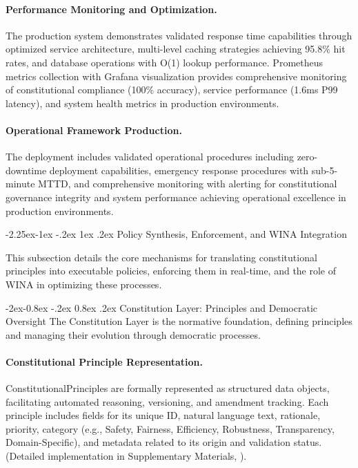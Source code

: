 \documentclass[manuscript,screen,9pt]{acmart}
\makeatletter
\renewcommand\subsection{\@startsection{subsection}{2}{\z@}%
  {-2.25ex\@plus -1ex \@minus -.2ex}%
  {1ex \@plus .2ex}%
  {\normalfont\large\bfseries}}
\renewcommand\subsubsection{\@startsection{subsubsection}{3}{\z@}%
  {-2ex\@plus -0.8ex \@minus -.2ex}%
  {0.8ex \@plus .2ex}%
  {\normalfont\normalsize\bfseries}}
\makeatother
\begin{document}
\paragraph{Performance Monitoring and Optimization.} The production system demonstrates validated response time capabilities through optimized service architecture, multi-level caching strategies achieving 95.8\% hit rates, and database operations with O(1) lookup performance. Prometheus metrics collection with Grafana visualization provides comprehensive monitoring of constitutional compliance (100\% accuracy), service performance (1.6ms P99 latency), and system health metrics in production environments.

\paragraph{Operational Framework Production.} The deployment includes validated operational procedures including zero-downtime deployment capabilities, emergency response procedures with sub-5-minute MTTD, and comprehensive monitoring with alerting for constitutional governance integrity and system performance achieving operational excellence in production environments.

\subsection{Policy Synthesis, Enforcement, and WINA Integration}
\label{subsec:policy_synthesis_enforcement}

This subsection details the core mechanisms for translating constitutional principles into executable policies, enforcing them in real-time, and the role of WINA in optimizing these processes.

\subsubsection{Constitution Layer: Principles and Democratic Oversight}
\label{subsubsec:constitution_layer}
The Constitution Layer is the normative foundation, defining principles and managing their evolution through democratic processes.

\paragraph{Constitutional Principle Representation.} ConstitutionalPrinciples are formally represented as structured data objects, facilitating automated reasoning, versioning, and amendment tracking. Each principle includes fields for its unique ID, natural language text, rationale, priority, category (e.g., Safety, Fairness, Efficiency, Robustness, Transparency, Domain-Specific), and metadata related to its origin and validation status. (Detailed implementation in Supplementary Materials, ).
\end{document}
